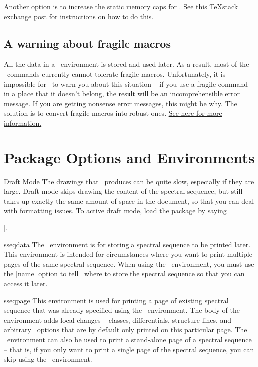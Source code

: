 \begin{sseqdata}[name = basic, cohomological Serre grading]
Another option is to increase the static memory caps for \pdfLaTeX. See \href{https://tex.stackexchange.com/a/26213}{this \TeX stack exchange post} for instructions on how to do this.

\subsection{A warning about fragile macros}
All the data in a \sseqpages\  environment is stored and used later. As a result, most of the \sseqpages\  commands currently cannot tolerate fragile macros. Unfortunately, it is impossible for \sseqpages\  to warn you about this situation -- if you use a fragile command in a place that it doesn't belong, the result will be an incomprehensible error message. If you are getting nonsense error messages, this might be why. The solution is to convert fragile macros into robust ones. \href{http://www.tex.ac.uk/FAQ-protect.html}{See here for more information.}


\section{Package Options and Environments}
\begin{manualentry}{Draft Mode}
The drawings that \sseqpages\ produces can be quite slow, especially if they are large. Draft mode skips drawing the content of the spectral sequence, but still takes up exactly the same amount of space in the document, so that you can deal with formatting issues. To active draft mode, load the package by saying |\usepackage[draft]{spectralsequences}|.
\end{manualentry}

\begin{environment}{{sseqdata}\moptions}
The \sseqdataenv\  environment is for storing a spectral sequence to be printed later. This environment is intended for circumstances where you want to print multiple pages of the same spectral sequence. When using the \sseqdataenv\  environment, you must use the |name| option to tell \sseqpages\  where to store the spectral sequence so that you can access it later.
\end{environment}

\begin{environment}{{sseqpage}\ooptions}
This environment is used for printing a page of existing spectral sequence that was already specified using the \sseqdataenv\  environment. The body of the environment adds local changes -- classes, differentials, structure lines, and arbitrary \tikzpkg\  options that are by default only printed on this particular page. The \sseqpageenv\  environment can also be used to print a stand-alone page of a spectral sequence -- that is, if you only want to print a single page of the spectral sequence, you can skip using the \sseqdataenv\  environment.
\end{environment}


\end{sseqdata}
